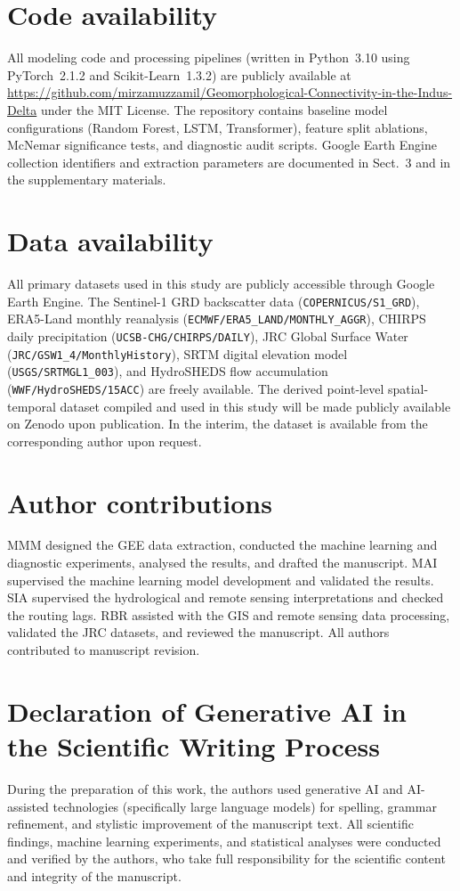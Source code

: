 \documentclass[12pt, a4paper]{article}
\newcommand{\codeavailability}{\section*{Code availability}}
\newcommand{\dataavailability}{\section*{Data availability}}
\newcommand{\authorcontribution}{\section*{Author contributions}}
\begin{document}






\codeavailability
All modeling code and processing pipelines (written in Python~3.10 using
PyTorch~2.1.2 and Scikit-Learn~1.3.2) are publicly available at
\url{https://github.com/mirzamuzzamil/Geomorphological-Connectivity-in-the-Indus-Delta}
under the MIT License.
The repository contains baseline model configurations (Random Forest, LSTM,
Transformer), feature split ablations, McNemar significance tests, and
diagnostic audit scripts.
Google Earth Engine collection identifiers and extraction parameters are
documented in Sect.~3 and in the supplementary materials.

\dataavailability
All primary datasets used in this study are publicly accessible through
Google Earth Engine.
The Sentinel-1 GRD backscatter data (\verb|COPERNICUS/S1_GRD|),
ERA5-Land monthly reanalysis (\verb|ECMWF/ERA5_LAND/MONTHLY_AGGR|),
CHIRPS daily precipitation (\verb|UCSB-CHG/CHIRPS/DAILY|),
JRC Global Surface Water (\verb|JRC/GSW1_4/MonthlyHistory|),
SRTM digital elevation model (\verb|USGS/SRTMGL1_003|), and
HydroSHEDS flow accumulation (\verb|WWF/HydroSHEDS/15ACC|) are freely
available.
The derived point-level spatial-temporal dataset compiled and used in this study will be made publicly available on Zenodo upon publication. In the interim, the dataset is available from the corresponding author upon request.

\authorcontribution
MMM designed the GEE data extraction, conducted the machine learning and diagnostic experiments, analysed the results, and drafted the manuscript. MAI supervised the machine learning model development and validated the results. SIA supervised the hydrological and remote sensing interpretations and checked the routing lags. RBR assisted with the GIS and remote sensing data processing, validated the JRC datasets, and reviewed the manuscript. All authors contributed to manuscript revision.

\section*{Declaration of Generative AI in the Scientific Writing Process}
During the preparation of this work, the authors used generative AI and AI-assisted technologies (specifically large language models) for spelling, grammar refinement, and stylistic improvement of the manuscript text. All scientific findings, machine learning experiments, and statistical analyses were conducted and verified by the authors, who take full responsibility for the scientific content and integrity of the manuscript.
\end{document}

